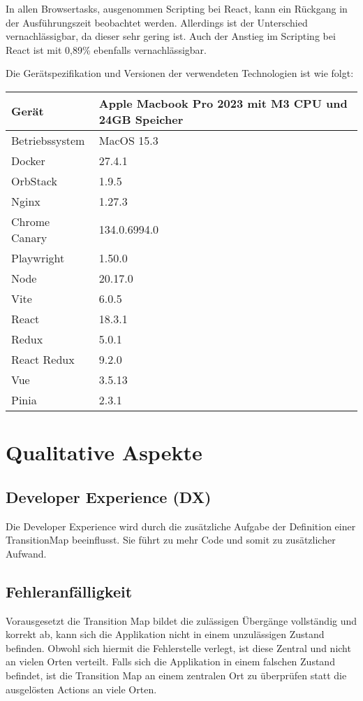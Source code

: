 In allen Browsertasks, ausgenommen Scripting bei React, kann ein Rückgang in der Ausführungszeit beobachtet werden. Allerdings ist der Unterschied vernachlässigbar, da dieser sehr gering ist. Auch der Anstieg im Scripting bei React ist mit 0,89\% ebenfalls vernachlässigbar.

Die Gerätspezifikation und Versionen der verwendeten Technologien ist wie folgt:

\begin{center}
  \begin{tabular}{ | m{5cm}| m{5cm} | } 
    \hline
    Gerät & Apple Macbook Pro 2023 mit M3 CPU und 24GB Speicher \\ 
    \hline
    Betriebssystem & MacOS 15.3 \\ 
    \hline
    Docker & 27.4.1 \\ 
    \hline
    OrbStack & 1.9.5 \\ 
    \hline
    Nginx & 1.27.3 \\ 
    \hline
    Chrome Canary & 134.0.6994.0 \\ 
    \hline
    Playwright & 1.50.0 \\ 
    \hline
    Node & 20.17.0 \\ 
    \hline
    Vite & 6.0.5 \\ 
    \hline
    React & 18.3.1 \\ 
    \hline
    Redux & 5.0.1 \\ 
    \hline
    React Redux & 9.2.0 \\ 
    \hline
    Vue & 3.5.13 \\ 
    \hline
    Pinia & 2.3.1 \\ 
    \hline
  \end{tabular}
\end{center}

\section{Qualitative Aspekte}

\subsection{Developer Experience (DX)}
Die Developer Experience wird durch die zusätzliche Aufgabe der Definition einer TransitionMap beeinflusst. Sie führt zu mehr Code und somit zu zusätzlicher Aufwand.

\subsection{Fehleranfälligkeit}
Vorausgesetzt die Transition Map bildet die zulässigen Übergänge vollständig und korrekt ab, kann sich die Applikation nicht in einem unzulässigen Zustand befinden. Obwohl sich hiermit die Fehlerstelle verlegt, ist diese Zentral und nicht an vielen Orten verteilt. Falls sich die Applikation in einem falschen Zustand befindet, ist die Transition Map an einem zentralen Ort zu überprüfen statt die ausgelösten Actions an viele Orten.


